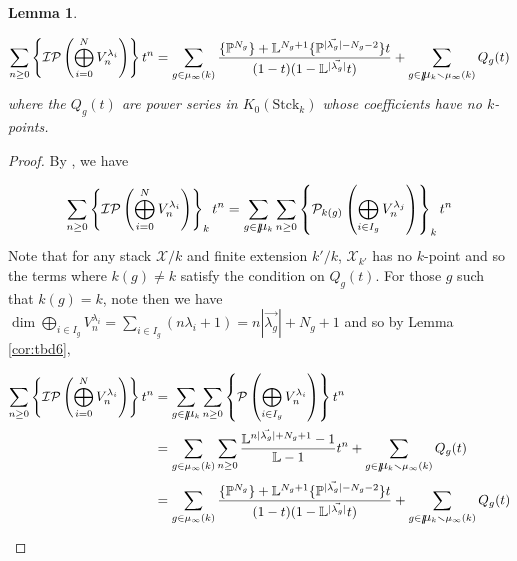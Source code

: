 \documentclass[a4paper,12pt]{amsart}
\newtheorem{lem}[thm]{Lemma}
\theoremstyle{definition}
\newcommand{\cX}{\mathcal{X}}
\newcommand{\cP}{\mathcal{P}}
\newcommand{\Bmu}{\mbox{$\raisebox{-0.59ex}
		{$l$}\hspace{-0.18em}\mu\hspace{-0.88em}\raisebox{-0.98ex}{\scalebox{2}
			{$\color{white}.$}}\hspace{-0.416em}\raisebox{+0.88ex}
		{$\color{white}.$}\hspace{0.46em}$}{}}
\newcommand{\Pc}{\mathcal{P}}
\newcommand{\Ic}{\mathcal{I}}
\newcommand{\Pb}{\mathbb{P}}
\newcommand{\Lb}{\mathbb{L}}
\renewcommand{\setminus}{\smallsetminus}
\begin{document}
	\begin{lem}\label{cor:tbd7}
		
		\begin{align*}
			\sum_{n \ge 0} \left\{ \Ic\Pc \left(\bigoplus_{i = 0}^N V_{n}^{\lambda_i} \right) \right\} t^n = \sum_{g \in \mu_\infty(k)} \frac{ \{\Pb^{{N_g}}\} + \Lb^{{{N_g}}+1} \{\Pb^{|\vec{\lambda_{g}}|-{{N_g}}-2} \} t}{(1-t)(1-\Lb^{|\vec{\lambda_{g}}|}t)} + \sum_{g \in \Bmu_k \setminus \mu_\infty(k)} Q_g(t)
		\end{align*}
		where the $Q_g(t)$ are power series in $K_0(\mathrm{Stck}_k)$ whose coefficients have no $k$-points. 
		
	\end{lem}
	
	\begin{proof} 
		
		By \cite[Prop. 3.5]{HP2}, we have
		
		\begin{equation*}
			\sum_{n \ge 0} \left\{ \Ic\Pc \left(\bigoplus_{i = 0}^N V_{n}^{\lambda_i} \right) \right\}_k t^n = \sum_{g \in \Bmu_k}\sum_{n \geq 0} \left\{\cP_{k(g)}\left(\bigoplus_{i \in I_g} V_n^{\lambda_j}\right)\right\}_k t^n
		\end{equation*}
		Note that for any stack $\cX/k$ and finite extension $k'/k$, $\cX_{k'}$ has no $k$-point and so the terms where $k(g) \neq k$ satisfy the condition on $Q_g(t)$. For those $g$ such that $k(g) = k$, note then we have $\dim \bigoplus\limits_{i \in I_g} V_{n}^{\lambda_i} = \sum\limits_{i \in I_g} (n\lambda_i+1) = n|\vec{\lambda_{g}}| + {N_g} + 1$ and so by Lemma \ref{cor:tbd6},
		
		\begin{align*}
			\sum_{n \ge 0} \left\{ \Ic\Pc \left(\bigoplus_{i = 0}^N V_{n}^{\lambda_i} \right) \right\} t^n &= \sum_{g \in \Bmu_k} \sum_{n \ge 0} \left\{\Pc \left(\bigoplus_{i \in I_g} V_{n}^{\lambda_i} \right)\right\} t^n \\
			&= \sum_{g \in \mu_\infty(k)} \sum_{n \ge 0} \frac{ \Lb^{n|\vec{\lambda_{g}}| + {N_g} + 1} - 1}{\Lb-1}t^n + \sum_{g \in \Bmu_k \setminus \mu_\infty(k)} Q_g(t) \\
			&= \sum_{g \in \mu_\infty(k)} \frac{ \{\Pb^{{N_g}}\} + \Lb^{{{N_g}}+1} \{\Pb^{|\vec{\lambda_{g}}|-{{N_g}}-2} \} t}{(1-t)(1-\Lb^{|\vec{\lambda_{g}}|}t)} +\sum_{g \in \Bmu_k \setminus \mu_\infty(k)} Q_g(t) 
		\end{align*}
		
		
	\end{proof} 
	
\end{document}
